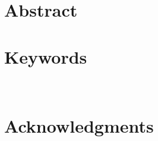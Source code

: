 \begin{titlepage}
\thispagestyle{fancy}
\renewcommand{\headrulewidth}{0pt}
  \fancyhead{}
  \fancyhead[l]{\small \pubnumber \\
	\small \pubmonth~\pubyear \\}
	\fancyfoot[c]{\thepage}
\section*{Abstract}
\pubabstract
\section*{Keywords}
\keywords
\newpage
\vspace*{-3cm}\small{\pubnumber \newline  \pubmonth~\pubyear}
\vspace{18pt}
\begin{center}
\tableofcontents
\appendixtitleon
\appendixtitletocon
\listoftables
\listoffigures
\end{center}
\pagebreak
\thispagestyle{fancy}
\renewcommand{\headrulewidth}{0pt}
  \fancyhead{}
  \fancyhead[l]{\small \pubnumber \\
	\small \pubmonth~\pubyear \\}
	\fancyfoot[c]{\thepage}
\section*{Acknowledgments}


\end{titlepage}
